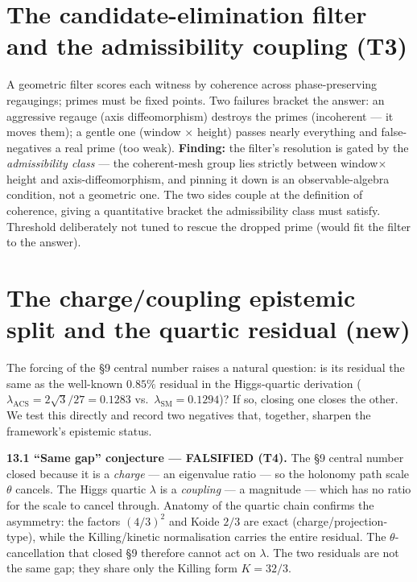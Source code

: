 \documentclass[11pt]{article}
\begin{document}
\section{The candidate-elimination filter and the admissibility coupling (T3)}

A geometric filter scores each witness by coherence across phase-preserving regaugings; primes must be fixed points. Two failures bracket the answer: an aggressive regauge (axis diffeomorphism) destroys the primes (incoherent --- it moves them); a gentle one (window $\times$ height) passes nearly everything and false-negatives a real prime (too weak). \textbf{Finding:} the filter's resolution is gated by the \emph{admissibility class} --- the coherent-mesh group lies strictly between window$\times$height and axis-diffeomorphism, and pinning it down is an observable-algebra condition, not a geometric one. The two sides couple at the definition of coherence, giving a quantitative bracket the admissibility class must satisfy. Threshold deliberately not tuned to rescue the dropped prime (would fit the filter to the answer).

\section{The charge/coupling epistemic split and the quartic residual (new)}

The forcing of the \S9 central number raises a natural question: is its residual the same as the well-known $0.85\%$ residual in the Higgs-quartic derivation ($\lambda_{\text{ACS}}=2\sqrt3/27=0.1283$ vs.\ $\lambda_{\text{SM}}=0.1294$)? If so, closing one closes the other. We test this directly and record two negatives that, together, sharpen the framework's epistemic status.

\textbf{13.1 ``Same gap'' conjecture --- FALSIFIED (T4).} The \S9 central number closed because it is a \emph{charge} --- an eigenvalue ratio --- so the holonomy path scale $\theta$ cancels. The Higgs quartic $\lambda$ is a \emph{coupling} --- a magnitude --- which has no ratio for the scale to cancel through. Anatomy of the quartic chain confirms the asymmetry: the factors $(4/3)^2$ and Koide $2/3$ are exact (charge/projection-type), while the Killing/kinetic normalisation carries the entire residual. The $\theta$-cancellation that closed \S9 therefore cannot act on $\lambda$. The two residuals are not the same gap; they share only the Killing form $K=32/3$.
\end{document}

